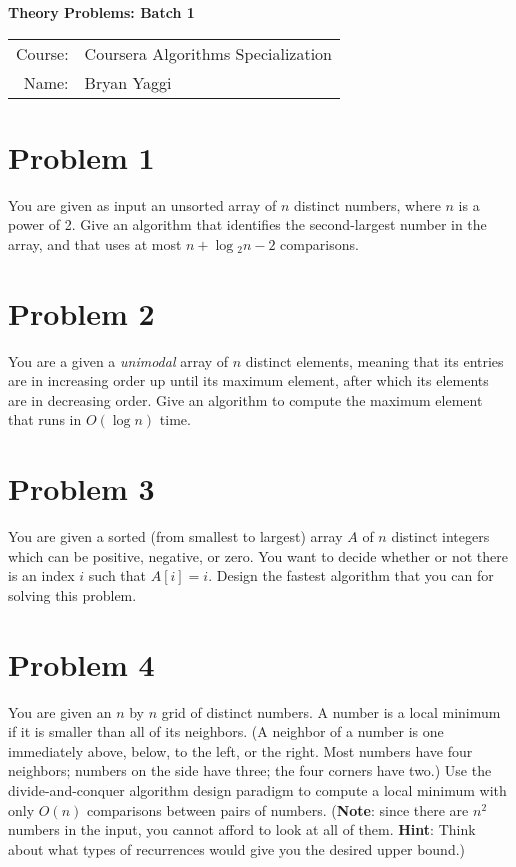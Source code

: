 \documentclass[10pt]{article}
\begin{document}
\begin{center}
{\Large \textbf{Theory Problems: Batch 1}}

\begin{tabular}{rl}
\\
Course: & Coursera Algorithms Specialization \\
Name: & Bryan Yaggi
\end{tabular}
\end{center}

\section*{\normalsize Problem 1}

You are given as input an unsorted array of $n$ distinct numbers, where $n$ is a power of 2. Give an algorithm that identifies the second-largest number in the array, and that uses at most $n + \log⁡_2 n - 2$ comparisons.

\section*{\normalsize Problem 2}

You are a given a \textit{unimodal} array of $n$ distinct elements, meaning that its entries are in increasing order up until its maximum element, after which its elements are in decreasing order. Give an algorithm to compute the maximum element that runs in $O(\log n)$ time.

\section*{\normalsize Problem 3}

You are given a sorted (from smallest to largest) array $A$ of $n$ distinct integers which can be positive, negative, or zero. You want to decide whether or not there is an index $i$ such that $A[i] = i$. Design the fastest algorithm that you can for solving this problem.

\section*{\normalsize Problem 4}

You are given an $n$ by $n$ grid of distinct numbers. A number is a local minimum if it is smaller than all of its neighbors. (A neighbor of a number is one immediately above, below, to the left, or the right. Most numbers have four neighbors; numbers on the side have three; the four corners have two.) Use the divide-and-conquer algorithm design paradigm to compute a local minimum with only $O(n)$ comparisons between pairs of numbers. (\textbf{Note}: since there are $n^2$ numbers in the input, you cannot afford to look at all of them. \textbf{Hint}: Think about what types of recurrences would give you the desired upper bound.)
\end{document}
